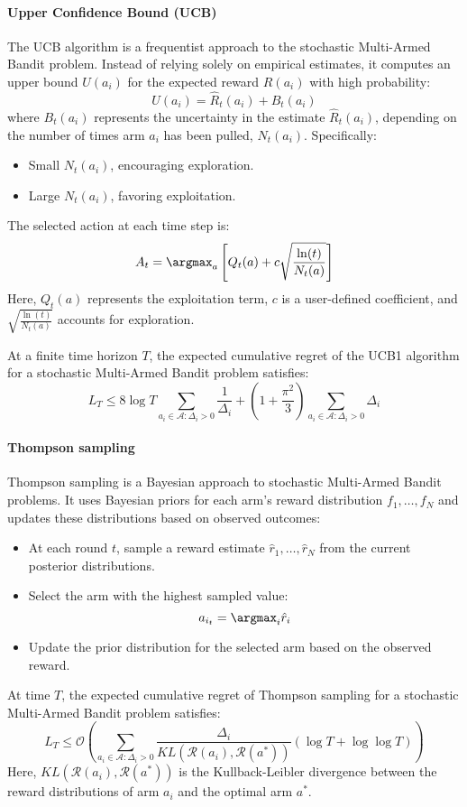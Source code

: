 \paragraph*{Upper Confidence Bound (UCB)}
The UCB algorithm is a frequentist approach to the stochastic Multi-Armed Bandit problem. 
Instead of relying solely on empirical estimates, it computes an upper bound $U(a_i)$ for the expected reward $R(a_i)$ with high probability:
\[U(a_i) = \hat{R}_t(a_i) + B_t(a_i)\]
where $B_t(a_i)$ represents the uncertainty in the estimate $\hat{R}_t(a_i)$, depending on the number of times arm $a_i$ has been pulled, $N_t(a_i)$. Specifically:
\begin{itemize}
    \item Small $N_t(a_i)$, encouraging exploration.
    \item Large $N_t(a_i)$, favoring exploitation.
\end{itemize}
The selected action at each time step is:
\[A_t = \argmax_a \left[ Q_t(a) + c \sqrt{\frac{\ln(t)}{N_t(a)}} \right]\]
Here, $Q_t(a)$ represents the exploitation term, $c$ is a user-defined coefficient, and $\sqrt{\frac{\ln(t)}{N_t(a)}}$ accounts for exploration.

\begin{theorem}
    At a finite time horizon $T$, the expected cumulative regret of the UCB1 algorithm for a stochastic Multi-Armed Bandit problem satisfies:
    \[L_T \leq 8 \log T \sum_{a_i \in \mathcal{A} : \Delta_i > 0} \frac{1}{\Delta_i} + \left( 1 + \frac{\pi^2}{3} \right) \sum_{a_i \in \mathcal{A} : \Delta_i > 0} \Delta_i\]
\end{theorem}

\paragraph*{Thompson sampling}
Thompson sampling is a Bayesian approach to stochastic Multi-Armed Bandit problems. 
It uses Bayesian priors for each arm's reward distribution $f_1, \dots, f_N$ and updates these distributions based on observed outcomes:
\begin{itemize}
    \item At each round $t$, sample a reward estimate $\hat{r}_1, \dots, \hat{r}_N$ from the current posterior distributions.
    \item Select the arm with the highest sampled value:
        \[a_{i_t} = \argmax_i \hat{r}_i\]
    \item Update the prior distribution for the selected arm based on the observed reward.
\end{itemize}

\begin{theorem}
    At time $T$, the expected cumulative regret of Thompson sampling for a stochastic Multi-Armed Bandit problem satisfies:
    \[L_T \leq \mathcal{O}\left( \sum_{a_i \in \mathcal{A} : \Delta_i > 0} \frac{\Delta_i}{KL(\mathcal{R}(a_i), \mathcal{R}(a^\ast))} \left( \log T + \log\log T \right) \right)\]
    Here, $KL(\mathcal{R}(a_i), \mathcal{R}(a^\ast))$ is the Kullback-Leibler divergence between the reward distributions of arm $a_i$ and the optimal arm $a^\ast$.
\end{theorem}